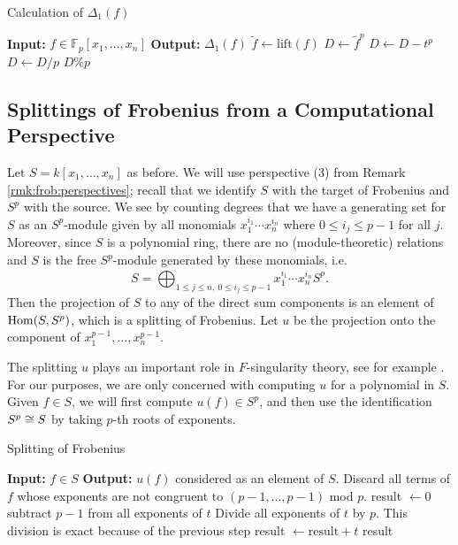 \begin{algorithm}[H]
\caption{Calculation of \(\Delta_{1}(f)\) }
	\label{alg:calc:delta1}
    \begin{algorithmic}[1]
		\State \textbf{Input:} \(f \in \mathbb{F}_{p}[x_{1}, \ldots, x_{n}]\) 
		\State \textbf{Output:} $\Delta_1(f)$
		\State \(\tilde{f} \gets \text{lift}(f)\) 
		\State \(D \gets \tilde{f}^{p}\) 
		    \State \(D \gets D - t^{p}\) 
		\EndFor
		\State \(D \gets D / p\)
		\State \Return \(D \% p\) 
	\end{algorithmic}
\end{algorithm}

\subsection{Splittings of Frobenius from a Computational Perspective}

Let \(S = k[x_{1}, \ldots, x_{n}]\) as before. 
We will use perspective (3) from
Remark \ref{rmk:frob:perspectives}; 
recall that we identify 
\(S\) with the target of Frobenius and
\(S^{p}\) with the source.
We see 
by counting degrees
that we have a generating set for \(S\) as an
\(S^{p}\)-module given by
all monomials
\(x_{1}^{i_{1}}\cdots x_{n}^{i_{n}}\)
where \(0 \leq i_{j} \leq p-1\) for all \(j\).
Moreover, since \(S\) is a polynomial ring, 
there are no (module-theoretic) relations
and
\(S\) is the free \(S^{p}\)-module generated by 
these monomials, i.e.  \[
S = \bigoplus_{1 \leq j \leq n,~ 0 \leq i_{j} \leq p-1}^{} x_{1}^{i_{1}}\cdots x_{n}^{i_{n}} S^{p}
.\] 
Then the projection of \(S\) to any of the direct sum components
is an element of \(\operatorname{Hom}(S,S^{p})\), which is a
splitting of Frobenius.
Let \(u\) be the projection onto the component of
\(x_{1}^{p-1}, \ldots, x_{n}^{p-1}\).

The splitting \(u\) plays an important role in \(F\)-singularity
theory, see for example 
\cite[Claim~2.6]{ma-polstra-2021-F-sing-comm-alg}.
For our purposes, we are only concerned with computing \(u\) 
for a polynomial in \(S\). 
Given \(f \in S\), we will first compute
\(u(f) \in S^{p}\), and then use the identification
\(S^{p} \cong S\) by taking \(p\)-th roots of 
exponents.

\begin{algorithm}[H]
\caption{Splitting of Frobenius}
\label{alg:naive:u}
\begin{algorithmic}[1]
\State \textbf{Input:} \(f \in S\) 
\State \textbf{Output:} \(u(f)\) considered as an element of \(S\).
\State Discard all terms of \(f\) whose exponents are not congruent to
	\((p-1, \ldots, p-1)\) mod \(p\).
\State result \(\gets 0\)	
    \State subtract \(p-1\) from all exponents of \(t\)
    \State Divide all exponents of \(t\) by \(p\).
    \Comment This division is exact because of the previous step
    \State result \(\gets \text{result} + t\)
\EndFor 
\State \Return result
\end{algorithmic}
\end{algorithm}


